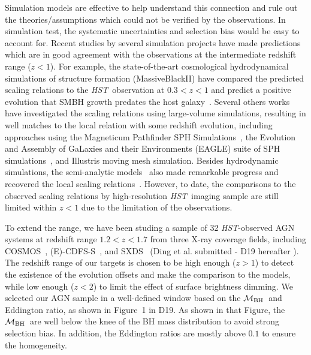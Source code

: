 \documentclass{natureprintstyle}
\newcommand{\hst}{{\it HST}}
\newcommand{\mbh}{$\mathcal M_{\rm BH}$}
\begin{document}
Simulation models are effective to help understand this connection and rule out the theories/assumptions which could not be verified by the observations. In simulation test, the systematic uncertainties and selection bias would be easy to account for. Recent studies by several simulation projects have made predictions which are in good agreement with the observations at the intermediate redshift range ($z<1$). For example, the state-of-the-art cosmological hydrodynamical simulations of structure formation (MassiveBlackII) have compared the predicted scaling relations to the \hst\ observation at $0.3<z<1$ and predict a positive evolution that SMBH growth predates the host galaxy~\cite{DeG++15}. Several others works have investigated the scaling relations using large-volume simulations, resulting in well matches to the local relation with some redshift evolution, including approaches using the Magneticum Pathfinder SPH Simulations~\cite{Steinborn2015}, the Evolution and Assembly of GaLaxies and their Environments (EAGLE) suite of SPH simulations~\cite{Schaye2015}, and Illustris moving mesh simulation\cite{Sijacki2015, Vogelsberger2014}. Besides hydrodynamic simulations, the semi-analytic models~\cite{Menci2014, Menci2016} also made remarkable progress and recovered the local scaling relations~\cite{Kormendy13}. However, to date, the comparisons to the observed scaling relations by high-resolution \hst\ imaging sample are still limited within $z<1$ due to the limitation of the observations.

To extend the range, we have been studing a sample of 32 \hst-observed AGN systems at redshift range $1.2<z<1.7$ from three X-ray coverage fields, including COSMOS~\cite{Civano2016}, (E)-CDFS-S~\cite{Lehmer2005, Xue2011}, and SXDS~\cite{Ueda2008} (Ding et al. submitted - D19 hereafter ). The redshift range of our targets is chosen to be high enough ($z>1$) to detect the existence of the evolution offsets and make the comparison to the models, while low enough ($z<2$) to limit the effect of surface brightness dimming. 
We selected our AGN sample in a well-defined window based on the \mbh\ and Eddington ratio, as shown in Figure~1 in D19. As shown in that Figure, the \mbh\ are well below the knee of the BH mass distribution to avoid strong selection bias. In addition, the Eddington ratios are mostly above $0.1$ to ensure the homogeneity.
\end{document}
